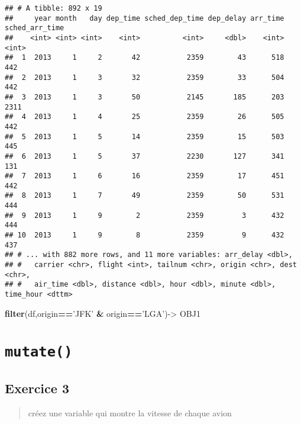 \documentclass[
]{article}
\newenvironment{Shaded}{\begin{snugshade}}{\end{snugshade}}
\newcommand{\KeywordTok}[1]{\textcolor[rgb]{0.13,0.29,0.53}{\textbf{#1}}}
\newcommand{\NormalTok}[1]{#1}
\newcommand{\OperatorTok}[1]{\textcolor[rgb]{0.81,0.36,0.00}{\textbf{#1}}}
\newcommand{\StringTok}[1]{\textcolor[rgb]{0.31,0.60,0.02}{#1}}
\begin{document}
\begin{verbatim}
## # A tibble: 892 x 19
##     year month   day dep_time sched_dep_time dep_delay arr_time sched_arr_time
##    <int> <int> <int>    <int>          <int>     <dbl>    <int>          <int>
##  1  2013     1     2       42           2359        43      518            442
##  2  2013     1     3       32           2359        33      504            442
##  3  2013     1     3       50           2145       185      203           2311
##  4  2013     1     4       25           2359        26      505            442
##  5  2013     1     5       14           2359        15      503            445
##  6  2013     1     5       37           2230       127      341            131
##  7  2013     1     6       16           2359        17      451            442
##  8  2013     1     7       49           2359        50      531            444
##  9  2013     1     9        2           2359         3      432            444
## 10  2013     1     9        8           2359         9      432            437
## # ... with 882 more rows, and 11 more variables: arr_delay <dbl>,
## #   carrier <chr>, flight <int>, tailnum <chr>, origin <chr>, dest <chr>,
## #   air_time <dbl>, distance <dbl>, hour <dbl>, minute <dbl>, time_hour <dttm>
\end{verbatim}

\begin{Shaded}
\begin{Highlighting}[]
  \KeywordTok{filter}\NormalTok{(df,origin}\OperatorTok{==}\StringTok{'JFK'} \OperatorTok{&}\StringTok{ }\NormalTok{origin}\OperatorTok{==}\StringTok{'LGA'}\NormalTok{)->}\StringTok{ }\NormalTok{OBJ1}
\end{Highlighting}
\end{Shaded}

\hypertarget{mutate}{%
\section{\texorpdfstring{\texttt{mutate()}}{mutate()}}\label{mutate}}

\hypertarget{exercice-3}{%
\subsection{Exercice 3}\label{exercice-3}}

\begin{quote}
créez une variable qui montre la vitesse de chaque avion
\end{quote}
\end{document}
